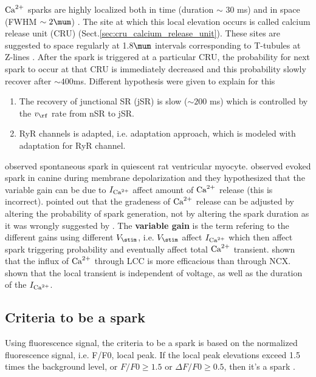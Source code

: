 ${\text{Ca}^{2+}}$ sparks are highly localized both in time (duration $\sim$ 30 ms) and in
space (FWHM $\sim 2\mum$) \citep{cheng1996ecc}. The site at which this local
elevation occurs is called calcium release unit (CRU)
(Sect.\ref{sec:cru_calcium_release_unit}).
These sites are suggested to space regularly at 1.8$\mum$ intervals
corresponding to T-tubules at Z-lines \citep{shacklock1995}.
After the spark is triggered at a particular CRU, the probability for next spark
to occur at that CRU is immediately decreased and this probability slowly
recover after $\sim 400$ms.
Different hypothesis were given to explain for this
\begin{enumerate}
  \item The recovery of junctional SR  (jSR) is slow ($\sim 200$ ms) which is
  controlled by the $v_\rf$ rate from nSR to jSR.
  \item RyR channels is adapted, i.e. adaptation approach, which is modeled with
  adaptation for RyR channel.
\end{enumerate}

\citep{cheng1993cse} observed spontaneous spark in quiescent rat ventricular
myocyte. \citep{lopez-lopez1994} observed evoked spark in canine during membrane
depolarization and they hypothesized that the variable gain can be due to
$I_{\text{Ca}^{2+}}$ affect amount of ${\text{Ca}^{2+}}$ release (this is incorrect).
\citep{cannell1995b} pointed out that the gradeness of ${\text{Ca}^{2+}}$ release can be
adjusted by altering  the probability of spark generation, not by altering the
spark duration as it was wrongly suggested by \citep{lopez-lopez1994}. The {\bf
variable gain} is the term refering to the different gains using different
$V_\stim$, i.e. $V_\stim$ affect $I_{\text{Ca}^{2+}}$ which then affect spark triggering
probability and eventually affect total ${\text{Ca}^{2+}}$ transient.
\citep{lopez-lopez1995} shown that the influx of ${\text{Ca}^{2+}}$ through LCC is
more efficacious than through NCX. \citep{lopez-lopez1995, cannell1995b}
shown that the local transient is independent of voltage, as well as the
duration of the $I_{\text{Ca}^{2+}}$.

\subsection{Criteria to be a spark}

Using fluorescence signal, the criteria to be a spark is based on the
normalized fluorescence signal, i.e. F/F0, local peak. If the local peak
elevations exceed 1.5 times the background level, or $F/F0\ge 1.5$ or $\Delta
F/F0 \ge 0.5$, then it's a spark \citep{howlett2006}. 

